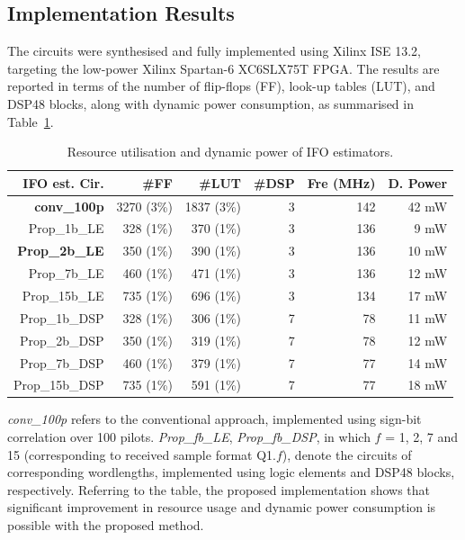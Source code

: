 \subsection{Implementation Results}
The circuits were synthesised and fully implemented using Xilinx ISE 13.2, targeting the low-power Xilinx Spartan-6 XC6SLX75T FPGA.
The results are reported in terms of the number of flip-flops (FF), look-up tables (LUT), and DSP48 blocks, along with dynamic power consumption, as summarised in Table~\ref{tab:Imp_Rpt}.
\begin{table}[h]
	\centering
	\caption{Resource utilisation and dynamic power of IFO estimators.}
	\label{tab:Imp_Rpt}
	\renewcommand{\arraystretch}{1.2}

	\begin{tabular}{r|r|r|r|r|r}

       \hline \hline
    		 IFO est. Cir. 	& \#FF & \#LUT  & \#DSP & Fre (MHz) & D. Power \\
    	\hline
		\textbf{conv\_100p}		& 3270 (3\%)	& 1837 (3\%)	& 3 &  142 	&  42	mW \\
		Prop\_1b\_LE			& 328 (1\%)		& 370 (1\%)		& 3 &  136 	&  9		mW\\
		\textbf{Prop\_2b\_LE}	& 350 (1\%)		& 390 (1\%)		& 3 &  136 	&  10 	mW\\
		Prop\_7b\_LE			& 460 (1\%)		& 471 (1\%)		& 3 &  136 	&  12 	mW\\
		Prop\_15b\_LE		      & 735 (1\%)		& 696 (1\%)		& 3 &  134 	&  17 	mW\\

		Prop\_1b\_DSP			& 328 (1\%)		& 306 (1\%)		& 7 &  78   	&  11 	mW\\
		Prop\_2b\_DSP			& 350 (1\%)		& 319 (1\%)		& 7 &  78   	&  12	mW\\
		Prop\_7b\_DSP			& 460 (1\%)		& 379 (1\%)		& 7 &  77   	&  14	mW\\
		Prop\_15b\_DSP			& 735 (1\%)		& 591 (1\%)		& 7 &  77 	&  18 	mW\\
    	\hline \hline
    \end{tabular}
\end{table}


\emph{conv\_100p} refers to the conventional approach, implemented using sign-bit correlation over 100 pilots.
\emph{Prop\_fb\_LE}, \emph{Prop\_fb\_DSP}, in which $f$ = 1, 2, 7 and 15 (corresponding to received sample format Q1.$f$), denote the circuits of corresponding wordlengths, implemented using logic elements and DSP48 blocks, respectively.
Referring to the table, the proposed implementation shows that significant improvement in resource usage and dynamic power consumption is possible with the proposed method.

